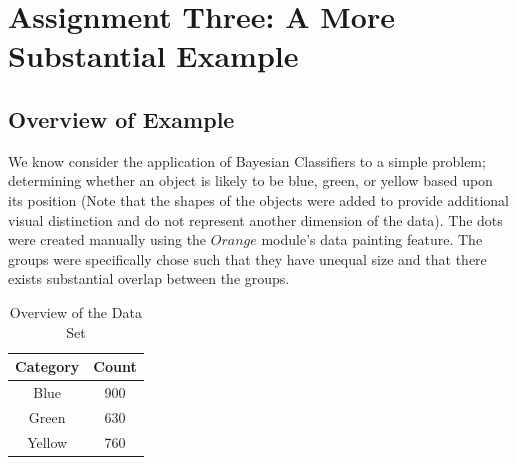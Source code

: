

\graphicspath{{C:/Documents and Settings/amcelhinney/My Documents/GitHub/MCS507--Project-3/tex/include/}}

\section{Assignment Three: A More Substantial Example} %
\subsection{Overview of Example} %
\begin{flushleft}We know consider the application of Bayesian Classifiers to a simple problem; determining whether an object is likely to be blue, green, or yellow based upon its position (Note that the shapes of the objects were added to provide additional visual distinction and do not represent another dimension of the data). The dots were created manually using the $Orange$ module's data painting feature. The groups were specifically chose such that they have unequal size and that there exists substantial overlap between the groups. 
\end{flushleft}

\begin{table}[H]
\caption{Overview of the Data Set}
\centering
\begin{tabular}{c c}
\hline\hline
Category & Count \\
\hline
Blue & 900 \\
Green & 630 \\
Yellow & 760 \\
\hline
\end{tabular}
\label{table:nonlin} 
\end{table}


